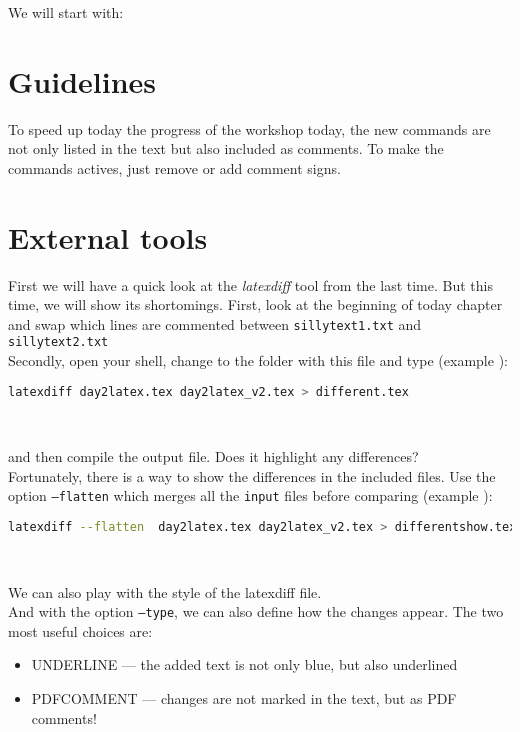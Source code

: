 \documentclass[a4paper,10pt]{report} %
\newcounter{samplecode}[chapter]
\begin{document}
We will start with:
  
%

\section{Guidelines}
To speed up today the progress of the workshop today, the new commands are not only listed in the text but also included as comments. To make the commands actives, just remove or add comment signs.

\section{External tools}
First we will have a quick look at the \emph{latexdiff} tool from the last time.
But this time, we will  show its shortomings. First, look at the beginning of today chapter and swap which lines are commented between  \texttt{sillytext1.txt} and \texttt{sillytext2.txt}\\

Secondly, open your shell, change to the folder with this file and type  (example ): 

\begin{lstlisting}[language={bash}, frame=single,basicstyle=\footnotesize]
  latexdiff day2latex.tex day2latex_v2.tex > different.tex
\end{lstlisting}~\vspace{1ex}

and then compile the output file. Does it highlight any differences?\\

Fortunately, there is a way to show the differences in the included files. Use the option \texttt{--flatten} which merges all the \texttt{input} files before comparing  (example ):
\begin{lstlisting}[language={bash}, frame=single,basicstyle=\footnotesize]
  latexdiff --flatten  day2latex.tex day2latex_v2.tex > differentshow.tex
\end{lstlisting}~\vspace{1ex}

We can also play with the style of the latexdiff file. \\


And with the option \texttt{--type}, we can also define how the changes appear. The two most useful choices are:
\begin{itemize}
 \item UNDERLINE --- the added text is not only blue, but also underlined 
 \item PDFCOMMENT --- changes are not marked in the text, but as PDF comments! 
\end{itemize}
\end{document}

